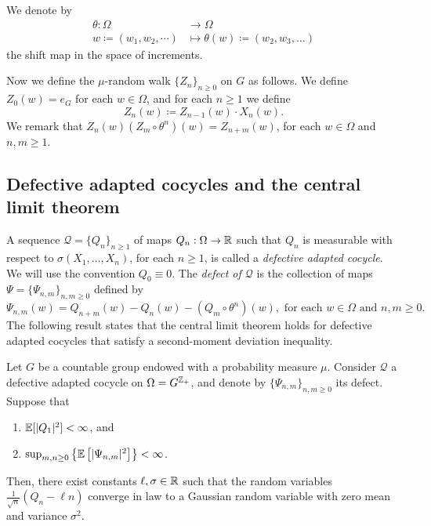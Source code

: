 We denote by
	\begin{equation*}
	\begin{aligned}
		\theta:\Omega&\to \Omega\\
		w\coloneqq(w_1,w_2,\cdots)&\mapsto \theta(w)\coloneqq (w_2,w_3,\ldots)
	\end{aligned}
\end{equation*}
the shift map in the space of increments.


Now we define the $\mu$-random walk $\{Z_n\}_{n\ge 0}$ on $G$ as follows. We define $Z_0(w)=e_G$ for each $w\in \Omega$, and for each $n\ge 1$ we define
\[
Z_n(w)\coloneqq Z_{n-1}(w)\cdot X_n(w).
\]
We remark that $Z_n(w) (Z_m\circ \theta^n)(w)=Z_{n+m}(w)$, for each $w\in \Omega$ and $n,m\ge 1$.


\subsection{Defective adapted cocycles and the central limit theorem}

A sequence $\mathcal{Q}=\{Q_n\}_{n\ge 1}$ of maps $Q_n:\Omega\to \mathbb{R}$ such that $Q_n$ is measurable with respect to $\sigma(X_1,\ldots, X_n)$, for each $n\ge 1$, is called a \emph{defective adapted cocycle}. We will use the convention $Q_0\equiv 0.$ The \emph{defect of $\mathcal{Q}$} is the collection of maps $\Psi=\{\Psi_{n,m}\}_{n,m\ge 0}$ defined by
\[
\Psi_{n,m}(w)=Q_{n+m}(w)-Q_n(w)-(Q_m\circ \theta^n)(w), \text{ for each }w\in \Omega \text{ and }n,m\ge 0.
\] 
The following result states that the central limit theorem holds for defective adapted cocycles that satisfy a second-moment deviation inequality.


\begin{thm} \label{thm: MS general CLT with constant deviation ineq}
	Let $G$ be a countable group endowed with a probability measure $\mu$. Consider $\mathcal{Q}$ a defective adapted cocycle on $\Omega=G^{\mathbb{Z}_{+}}$, and denote by $\{\Psi_{n,m}\}_{n,m\ge 0}$ its defect. Suppose that
	\begin{enumerate}
		\item $\mathbb{E}[|Q_1|^{2}]<\infty$, and
		\item 	$\sup_{m,n\ge 0} \left\{ \mathbb{E}\left[|\Psi_{n,m}|^2\right]\right\} <\infty$.
	\end{enumerate}
	
Then, there exist constants $\ell,\sigma\in \mathbb{R}$ such that the random variables $\frac{1}{\sqrt{n}}\left(Q_n-\ell n\right)$ converge in law to a Gaussian random variable with zero mean and variance $\sigma^2$.
\end{thm}

